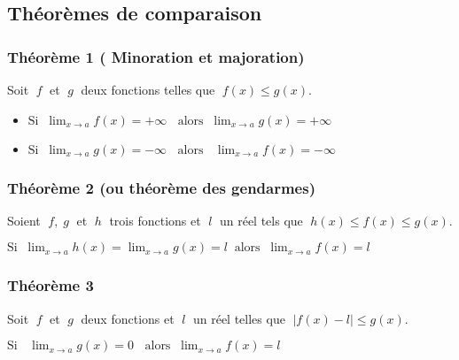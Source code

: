       \subsection{Théorèmes de comparaison}
\subsubsection*{Théorème 1 ( Minoration et  majoration)}
     \begin{theorem}
           Soit $\;f \;$ et $\;g \;$  deux fonctions telles que $\;   f(x)\leq g(x) $.
        \begin{itemize}           
         \item  $  \text{Si}\; \;\displaystyle \lim_{x \to a}{f(x)} =+\infty \;\; \text{ alors} \;\; \displaystyle\lim_{x \to a}{g(x)} =+\infty$
          
          
        \item   $ \text{Si}\;\; \displaystyle \lim_{x \to a}{g(x)} =-\infty \;\; \text{ alors }\;\; \lim_{x \to a}{f(x)} =-\infty$
          \end{itemize}
       \end{theorem}
     
      \subsubsection*{Théorème 2 (ou théorème  des gendarmes)}
          \begin{theorem}
            Soient  $\; f  , \; g  \; $  et  $ \; h \;$  trois fonctions et  $\;l \;$ un réel tels que  $ \; h(x)\leq f(x) \leq g(x).$
            
           $ \text{Si}\;  \; \displaystyle\lim_{x \to a}{h(x)} =\displaystyle\lim_{x \to a}{g(x)}=l  \;\; \text{alors} \;\; \lim_{x \to a}{f(x)} =l$ 
       \end{theorem}
     \subsubsection*{Théorème 3}
      \begin{theorem} Soit $\;  f \; $ et $\; g \;$  deux fonctions et $\; l  \; $  un réel telles que $\;\left|f(x)-l\right| \leq g(x).$
      
     $ \text{Si }\; \;\displaystyle\lim_{x \to a}{g(x)} =0 \;\; \text{ alors}\; \;\displaystyle \lim_{x \to a}{f(x)} =l$
     \end{theorem}
